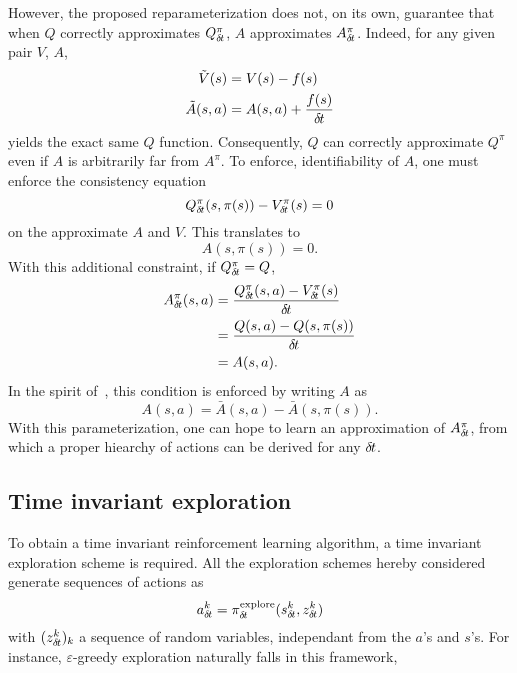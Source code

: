  However, the proposed reparameterization does not, on its own, guarantee that
when $Q$ correctly approximates $Q^\pi_{\delta\hspace{-.1em}t}$, $A$ approximates $A^\pi_{\delta\hspace{-.1em}t}$.
Indeed, for any given pair $V$, $A$,
\begin{align}
	\tilde{V}(s) &= V(s) - f(s)\\
	\tilde{A}(s, a) &= A(s, a) + \frac{f(s)}{{\delta\hspace{-.1em}t}}
\end{align}
yields the exact same $Q$ function. Consequently, $Q$ can correctly approximate
$Q^\pi$ even if $A$ is arbitrarily far from $A^\pi$.
To enforce, identifiability of $A$, one must enforce the consistency equation
\begin{equation}
	Q^\pi_{\delta\hspace{-.1em}t}(s, \pi(s)) - V^\pi_{\delta\hspace{-.1em}t}(s) = 0
\end{equation}
on the approximate $A$ and $V$. This translates to
\begin{equation}
	A(s, \pi(s)) = 0.
\end{equation}
With this additional constraint, if $Q^\pi_{\delta\hspace{-.1em}t} = Q$,
\begin{align}
	A^\pi_{\delta\hspace{-.1em}t}(s, a) &= \frac{Q^\pi_{\delta\hspace{-.1em}t}(s,a) - V^\pi_{\delta\hspace{-.1em}t}(s)}{{\delta\hspace{-.1em}t}}\\
		    &= \frac{Q(s,a) - Q(s, \pi(s))}{{\delta\hspace{-.1em}t}}\\
		    &= A(s, a).
\end{align}
In the spirit of~\cite{dueling_nets}, this condition is enforced by writing $A$ as
\begin{equation}
	A(s, a) = \bar{A}(s, a) - \bar{A}(s, \pi(s)).
\end{equation}
With this parameterization, one can hope to learn an approximation of $A^\pi_{\delta\hspace{-.1em}t}$,
from which a proper hiearchy of actions can be derived for any ${\delta\hspace{-.1em}t}$.

\subsection{Time invariant exploration}
\label{subsec:explo}
To obtain a time invariant reinforcement learning algorithm, a time invariant
exploration scheme is required. All the exploration schemes hereby considered
generate sequences of actions as
\begin{equation}
  \label{eq:explore}
	a^k_{\delta\hspace{-.1em}t} = \pi^\text{explore}_{\delta\hspace{-.1em}t}(s^k_{\delta\hspace{-.1em}t}, z^k_{\delta\hspace{-.1em}t})
\end{equation}
with $(z^k_{\delta\hspace{-.1em}t})_k$ a sequence of random variables, independant from the $a$'s and $s$'s.
For instance, $\varepsilon$-greedy exploration naturally falls in this framework, 

